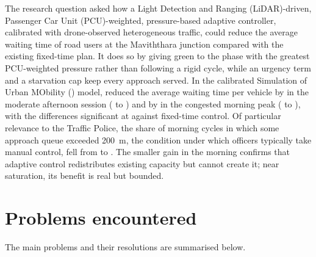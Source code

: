 The research question asked how a Light Detection and Ranging (LiDAR)-driven, Passenger Car Unit (PCU)-weighted, pressure-based adaptive controller, calibrated with drone-observed heterogeneous traffic, could reduce the average waiting time of road users at the Maviththara junction compared with the existing fixed-time plan. It does so by giving green to the phase with the greatest PCU-weighted pressure rather than following a rigid cycle, while an urgency term and a starvation cap keep every approach served. In the calibrated Simulation of Urban MObility (\sumo{}) model, \prism{} reduced the average waiting time per vehicle by  in the moderate afternoon session ( to ) and by  in the congested morning peak ( to ), with the differences significant at  against fixed-time control. Of particular relevance to the Traffic Police, the share of morning cycles in which some approach queue exceeded 200~m, the condition under which officers typically take manual control, fell from  to . The smaller gain in the morning confirms that adaptive control redistributes existing capacity but cannot create it; near saturation, its benefit is real but bounded.

\section{Problems encountered}\label{sec:conc-problems}

The main problems and their resolutions are summarised below.

